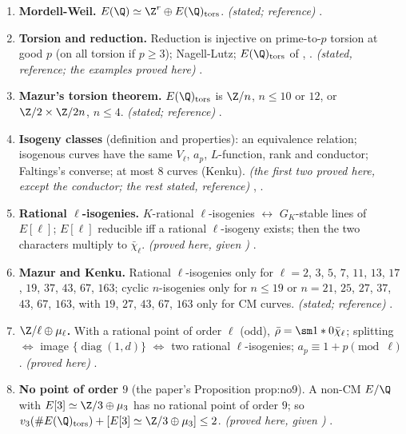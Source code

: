 \begin{enumerate}[label=\textbf{\thechapter.\arabic*}]
\emph{(proof sketched here, using )} .
\item \textbf{Mordell-Weil.} $E(\Q)\simeq\Z^r\oplus E(\Q)_{\mathrm{tors}}$. \emph{(stated; reference)} .
\item \textbf{Torsion and reduction.} Reduction is injective on prime-to-$p$ torsion at good $p$ (on all torsion if $p\ge3$); Nagell-Lutz; $E(\Q)_{\mathrm{tors}}$ of , . \emph{(stated, reference;
the examples proved here)} .
\item \textbf{Mazur's torsion theorem.} $E(\Q)_{\mathrm{tors}}$ is $\Z/n$, $n\le10$ or $12$, or $\Z/2\times\Z/2n$, $n\le4$. \emph{(stated; reference)} .
\item \textbf{Isogeny classes} (definition and properties): an equivalence relation; isogenous curves have the same $V_\ell$, $a_p$, $L$-function, rank and conductor; Faltings's converse; at most $8$ curves
(Kenku). \emph{(the first two proved here, except the conductor; the rest stated, reference)} , .
\item \textbf{Rational $\ell$-isogenies.} $K$-rational $\ell$-isogenies $\leftrightarrow$ $G_K$-stable lines of $E[\ell]$; $E[\ell]$ reducible iff a rational $\ell$-isogeny exists; then the two characters multiply to
$\bar\chi_\ell$. \emph{(proved here, given )} .
\item \textbf{Mazur and Kenku.} Rational $\ell$-isogenies only for $\ell=2$, $3$, $5$, $7$, $11$, $13$, $17$, $19$, $37$, $43$, $67$, $163$; cyclic $n$-isogenies only for $n\le19$ or $n=21$, $25$, $27$, $37$, $43$, $67$, $163$,
with $19$, $27$, $43$, $67$, $163$ only for CM curves. \emph{(stated; reference)} .
\item \textbf{$\Z/\ell\oplus\mu_\ell$.} With a rational point of order $\ell$ (odd), $\bar\rho=\sm1*0{\bar\chi_\ell}$; splitting $\Leftrightarrow$ image $\{\operatorname{diag}(1,d)\}$ $\Leftrightarrow$ two rational $\ell$-isogenies;
$a_p\equiv1+p\pmod\ell$. \emph{(proved here)} .
\item \textbf{No point of order $9$} (the paper's Proposition prop:no9). A non-CM $E/\Q$ with $E[3]\simeq\Z/3\oplus\mu_3$ has no rational point of order $9$; so
$v_3(\#E(\Q)_{\mathrm{tors}})+[E[3]\simeq\Z/3\oplus\mu_3]\le2$. \emph{(proved here, given )} .

\end{enumerate}
